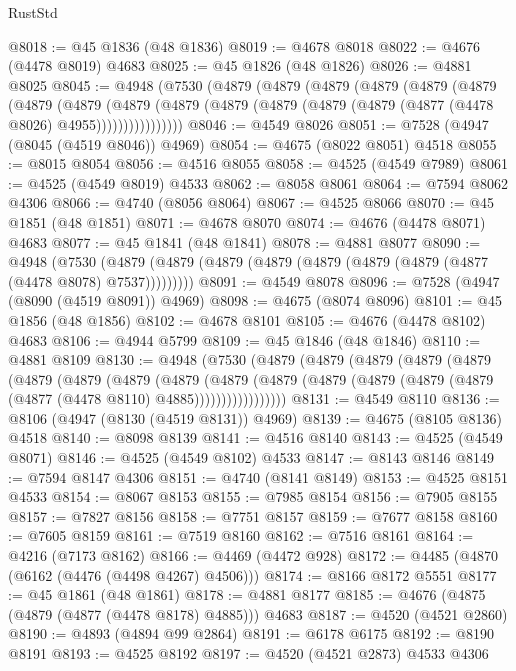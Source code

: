 \begin{lexlean}{RustStd}
\begin{coremodule}
{\begin{coremodule}
{{{{{{{{{{{{{{{{{{{{{{{{{{{{{{{{{{{{{{{{{{{{{{{{{{{{{{{{{{{{@8018 := @45 @1836 (@48 @1836)
@8019 := @4678 @8018
@8022 := @4676 (@4478 @8019) @4683
@8025 := @45 @1826 (@48 @1826)
@8026 := @4881 @8025
@8045 := @4948
    (@7530
      (@4879
        (@4879
          (@4879
            (@4879
              (@4879
                (@4879
                  (@4879
                    (@4879
                      (@4879
                        (@4879
                          (@4879 (@4879 (@4879 (@4879 (@4877 (@4478 @8026) @4955))))))))))))))))
@8046 := @4549 @8026
@8051 := @7528 (@4947 (@8045 (@4519 @8046)) @4969)
@8054 := @4675 (@8022 @8051) @4518
@8055 := @8015 @8054
@8056 := @4516 @8055
@8058 := @4525 (@4549 @7989)
@8061 := @4525 (@4549 @8019) @4533
@8062 := @8058 @8061
@8064 := @7594 @8062 @4306
@8066 := @4740 (@8056 @8064)
@8067 := @4525 @8066
@8070 := @45 @1851 (@48 @1851)
@8071 := @4678 @8070
@8074 := @4676 (@4478 @8071) @4683
@8077 := @45 @1841 (@48 @1841)
@8078 := @4881 @8077
@8090 := @4948
    (@7530 (@4879 (@4879 (@4879 (@4879 (@4879 (@4879 (@4879 (@4877 (@4478 @8078) @7537)))))))))
@8091 := @4549 @8078
@8096 := @7528 (@4947 (@8090 (@4519 @8091)) @4969)
@8098 := @4675 (@8074 @8096)
@8101 := @45 @1856 (@48 @1856)
@8102 := @4678 @8101
@8105 := @4676 (@4478 @8102) @4683
@8106 := @4944 @5799
@8109 := @45 @1846 (@48 @1846)
@8110 := @4881 @8109
@8130 := @4948
    (@7530
      (@4879
        (@4879
          (@4879
            (@4879
              (@4879
                (@4879
                  (@4879
                    (@4879
                      (@4879
                        (@4879
                          (@4879
                            (@4879 (@4879 (@4879 (@4879 (@4877 (@4478 @8110) @4885)))))))))))))))))
@8131 := @4549 @8110
@8136 := @8106 (@4947 (@8130 (@4519 @8131)) @4969)
@8139 := @4675 (@8105 @8136) @4518
@8140 := @8098 @8139
@8141 := @4516 @8140
@8143 := @4525 (@4549 @8071)
@8146 := @4525 (@4549 @8102) @4533
@8147 := @8143 @8146
@8149 := @7594 @8147 @4306
@8151 := @4740 (@8141 @8149)
@8153 := @4525 @8151 @4533
@8154 := @8067 @8153
@8155 := @7985 @8154
@8156 := @7905 @8155
@8157 := @7827 @8156
@8158 := @7751 @8157
@8159 := @7677 @8158
@8160 := @7605 @8159
@8161 := @7519 @8160
@8162 := @7516 @8161
@8164 := @4216 (@7173 @8162)
@8166 := @4469 (@4472 @928)
@8172 := @4485 (@4870 (@6162 (@4476 (@4498 @4267) @4506)))
@8174 := @8166 @8172 @5551
@8177 := @45 @1861 (@48 @1861)
@8178 := @4881 @8177
@8185 := @4676 (@4875 (@4879 (@4877 (@4478 @8178) @4885))) @4683
@8187 := @4520 (@4521 @2860)
@8190 := @4893 (@4894 @99 @2864)
@8191 := @6178 @6175
@8192 := @8190 @8191
@8193 := @4525 @8192
@8197 := @4520 (@4521 @2873) @4533 @4306
}}}}}}}}}}}}}}}}}}}}}}}}}}}}}}}}}}}}}}}}}}}}}}}}}}}}}}}}}}}}
\end{coremodule}}
\end{coremodule}
\end{lexlean}
